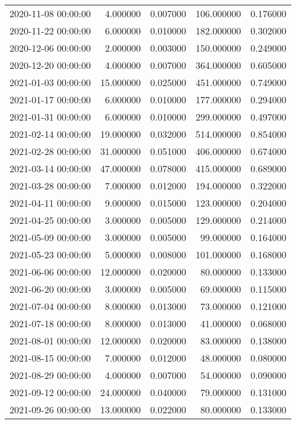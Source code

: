 \begin{tabular}{lrrrr}
2020-11-08 00:00:00 & 4.000000 & 0.007000 & 106.000000 & 0.176000 \\
2020-11-22 00:00:00 & 6.000000 & 0.010000 & 182.000000 & 0.302000 \\
2020-12-06 00:00:00 & 2.000000 & 0.003000 & 150.000000 & 0.249000 \\
2020-12-20 00:00:00 & 4.000000 & 0.007000 & 364.000000 & 0.605000 \\
2021-01-03 00:00:00 & 15.000000 & 0.025000 & 451.000000 & 0.749000 \\
2021-01-17 00:00:00 & 6.000000 & 0.010000 & 177.000000 & 0.294000 \\
2021-01-31 00:00:00 & 6.000000 & 0.010000 & 299.000000 & 0.497000 \\
2021-02-14 00:00:00 & 19.000000 & 0.032000 & 514.000000 & 0.854000 \\
2021-02-28 00:00:00 & 31.000000 & 0.051000 & 406.000000 & 0.674000 \\
2021-03-14 00:00:00 & 47.000000 & 0.078000 & 415.000000 & 0.689000 \\
2021-03-28 00:00:00 & 7.000000 & 0.012000 & 194.000000 & 0.322000 \\
2021-04-11 00:00:00 & 9.000000 & 0.015000 & 123.000000 & 0.204000 \\
2021-04-25 00:00:00 & 3.000000 & 0.005000 & 129.000000 & 0.214000 \\
2021-05-09 00:00:00 & 3.000000 & 0.005000 & 99.000000 & 0.164000 \\
2021-05-23 00:00:00 & 5.000000 & 0.008000 & 101.000000 & 0.168000 \\
2021-06-06 00:00:00 & 12.000000 & 0.020000 & 80.000000 & 0.133000 \\
2021-06-20 00:00:00 & 3.000000 & 0.005000 & 69.000000 & 0.115000 \\
2021-07-04 00:00:00 & 8.000000 & 0.013000 & 73.000000 & 0.121000 \\
2021-07-18 00:00:00 & 8.000000 & 0.013000 & 41.000000 & 0.068000 \\
2021-08-01 00:00:00 & 12.000000 & 0.020000 & 83.000000 & 0.138000 \\
2021-08-15 00:00:00 & 7.000000 & 0.012000 & 48.000000 & 0.080000 \\
2021-08-29 00:00:00 & 4.000000 & 0.007000 & 54.000000 & 0.090000 \\
2021-09-12 00:00:00 & 24.000000 & 0.040000 & 79.000000 & 0.131000 \\
2021-09-26 00:00:00 & 13.000000 & 0.022000 & 80.000000 & 0.133000 \\

\end{tabular}
